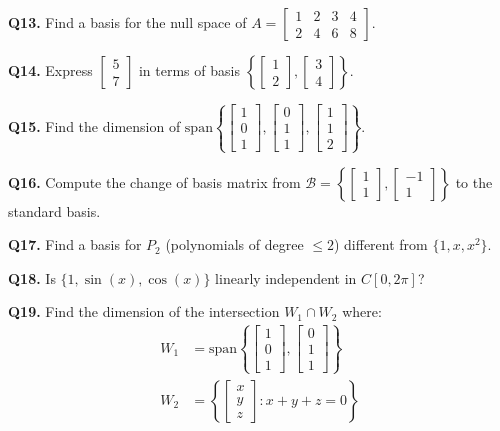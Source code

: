 \documentclass[12pt,a4paper]{article}
\theoremstyle{definition}
\begin{document}
\textbf{Q13.} Find a basis for the null space of $A = \begin{bmatrix} 1 & 2 & 3 & 4 \\ 2 & 4 & 6 & 8 \end{bmatrix}$.

\textbf{Q14.} Express $\begin{bmatrix} 5 \\ 7 \end{bmatrix}$ in terms of basis $\left\{\begin{bmatrix} 1 \\ 2 \end{bmatrix}, \begin{bmatrix} 3 \\ 4 \end{bmatrix}\right\}$.

\textbf{Q15.} Find the dimension of $\text{span}\left\{\begin{bmatrix} 1 \\ 0 \\ 1 \end{bmatrix}, \begin{bmatrix} 0 \\ 1 \\ 1 \end{bmatrix}, \begin{bmatrix} 1 \\ 1 \\ 2 \end{bmatrix}\right\}$.

\textbf{Q16.} Compute the change of basis matrix from $\mathcal{B} = \left\{\begin{bmatrix} 1 \\ 1 \end{bmatrix}, \begin{bmatrix} -1 \\ 1 \end{bmatrix}\right\}$ to the standard basis.

\textbf{Q17.} Find a basis for $P_2$ (polynomials of degree $\leq 2$) different from $\{1, x, x^2\}$.

\textbf{Q18.} Is $\{1, \sin(x), \cos(x)\}$ linearly independent in $C[0, 2\pi]$?

\textbf{Q19.} Find the dimension of the intersection $W_1 \cap W_2$ where:
\begin{align}
W_1 &= \text{span}\left\{\begin{bmatrix} 1 \\ 0 \\ 1 \end{bmatrix}, \begin{bmatrix} 0 \\ 1 \\ 1 \end{bmatrix}\right\} \\
W_2 &= \left\{\begin{bmatrix} x \\ y \\ z \end{bmatrix} : x + y + z = 0\right\}
\end{align}
\end{document}
